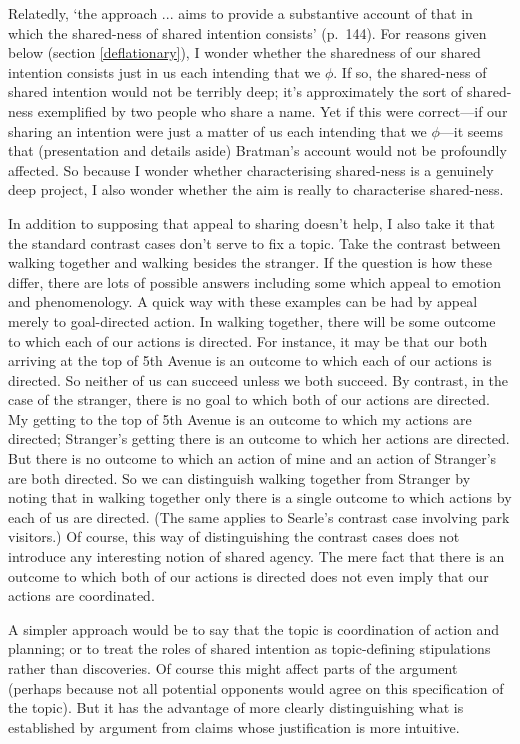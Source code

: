 \documentclass[12pt,letterpaper]{extarticle}
\begin{document}
Relatedly, `the approach ... aims to provide a substantive account of that in which the shared-ness of shared intention consists' (p.\ 144).
For reasons given below (section \vref{deflationary}), I wonder whether the sharedness of our shared intention consists just in us each intending that we $\phi$.  
If so, the shared-ness of shared intention would not be terribly deep; it's approximately the sort of shared-ness exemplified by two people who share a name.
Yet if this were correct---if our sharing an  intention were just a matter of us each intending that we $\phi$---it seems that (presentation and details aside) Bratman's account would not be profoundly affected.
So because I wonder whether characterising shared-ness is a genuinely deep project, I also wonder whether the aim is really to characterise shared-ness.

In addition to supposing that appeal to sharing doesn't help, 
I also take it that the standard contrast cases don't serve to fix a topic.
Take the contrast between walking together and walking besides the stranger.
If the question is how these differ, there are lots of possible answers including some which appeal to emotion and phenomenology.
A quick way with these examples can be had by appeal merely to goal-directed action.
In walking together, there will be some outcome to which each of our actions is directed.
For instance, it may be that our both arriving at the top of 5th Avenue is an outcome to which each of our actions is directed.
So neither of us can succeed unless we both succeed.
By contrast, in the case of the stranger, there is no goal to which both of our actions are directed.
My getting to the top of 5th Avenue is an outcome to which my actions are directed; Stranger's getting there is an outcome to which her actions are directed.
But there is no outcome to which an action of mine and an action of Stranger's are both directed.
So we can distinguish walking together from Stranger by noting that in walking together only there is a single outcome to which actions by each of us are directed.
(The same applies to Searle's contrast case involving park visitors.)
Of course, this way of distinguishing the contrast cases does not introduce any interesting notion of shared agency.
The mere fact that there is an outcome to which both of our actions is directed does not even imply that our actions are coordinated.

A simpler approach would be to say that the topic is coordination of action and planning; or to treat the roles of shared intention as topic-defining stipulations rather than discoveries.
Of course this might affect parts of the argument (perhaps because not all potential opponents would agree on this specification of the topic).
But it has the advantage of more clearly distinguishing what is established by argument from claims whose justification is more intuitive.
\end{document}

